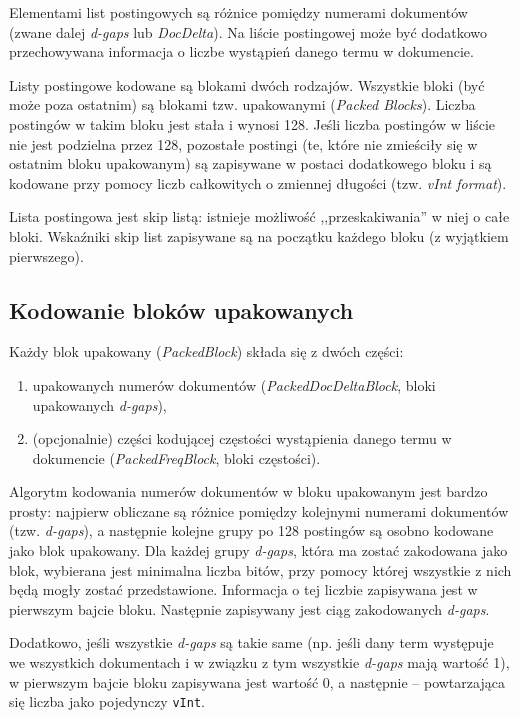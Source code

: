 Elementami list postingowych są różnice pomiędzy numerami dokumentów (zwane dalej \emph{d-gaps} lub \emph{DocDelta}). Na liście postingowej może być dodatkowo przechowywana informacja o liczbe wystąpień danego termu w dokumencie.

Listy postingowe kodowane są blokami dwóch rodzajów. Wszystkie bloki (być może poza ostatnim) są blokami tzw. upakowanymi (\emph{Packed Blocks}). Liczba postingów w takim bloku jest stała i wynosi 128. Jeśli liczba postingów w liście nie jest podzielna przez 128, pozostałe postingi (te, które nie zmieściły się w ostatnim bloku upakowanym) są zapisywane w postaci dodatkowego bloku i są kodowane przy pomocy liczb całkowitych o zmiennej długości (tzw. \emph{vInt format}).

Lista postingowa jest skip listą: istnieje możliwość ,,przeskakiwania'' w niej o całe bloki. Wskaźniki skip list zapisywane są na początku każdego bloku (z wyjątkiem pierwszego).

\subsection{Kodowanie bloków upakowanych}
\label{sec:packedBlockEncoding}

Każdy blok upakowany (\emph{PackedBlock}) składa się z dwóch części: 
\begin{enumerate}
 \item upakowanych numerów dokumentów (\emph{PackedDocDeltaBlock}, bloki upakowanych \emph{d-gaps}),
 \item (opcjonalnie) części kodującej częstości wystąpienia danego termu w dokumencie (\emph{PackedFreqBlock}, bloki częstości).
\end{enumerate}

Algorytm kodowania numerów dokumentów w bloku upakowanym jest bardzo prosty: najpierw obliczane są różnice pomiędzy kolejnymi numerami dokumentów (tzw. \emph{d-gaps}), a następnie kolejne grupy po 128 postingów są osobno kodowane jako blok upakowany. Dla każdej grupy \emph{d-gaps}, która ma zostać zakodowana jako blok, wybierana jest minimalna liczba bitów, przy pomocy której wszystkie z nich będą mogły zostać przedstawione. Informacja o tej liczbie zapisywana jest w pierwszym bajcie bloku. Następnie zapisywany jest ciąg zakodowanych \emph{d-gaps}.

Dodatkowo, jeśli wszystkie \emph{d-gaps} są takie same (np. jeśli dany term występuje we wszystkich dokumentach i w związku z tym wszystkie \emph{d-gaps} mają wartość 1), w pierwszym bajcie bloku zapisywana jest wartość 0, a następnie -- powtarzająca się liczba jako pojedynczy \texttt{vInt}.

